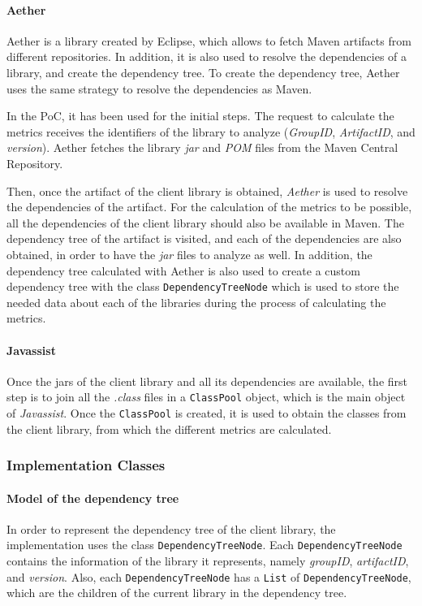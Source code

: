 \paragraph{Aether}
Aether is a library created by Eclipse, which allows to fetch Maven artifacts from different repositories. In addition, it is also used to resolve the dependencies of a library, and create the dependency tree. To create the dependency tree, Aether uses the same strategy to resolve the dependencies as Maven.

In the PoC, it has been used for the initial steps. The request to calculate the metrics receives the identifiers of the library to analyze (\textit{GroupID}, \textit{ArtifactID}, and \textit{version}). Aether fetches the library \textit{jar} and \textit{POM} files from the Maven Central Repository.

Then, once the artifact of the client library is obtained, \textit{Aether} is used to resolve the dependencies of the artifact. For the calculation of the metrics to be possible, all the dependencies of the client library should also be available in Maven. The dependency tree of the artifact is visited, and each of the dependencies are also obtained, in order to have the \textit{jar} files to analyze as well. In addition, the dependency tree calculated with Aether is also used to create a custom dependency tree with the class \texttt{DependencyTreeNode} which is used to store the needed data about each of the libraries during the process of calculating the metrics.

\paragraph{Javassist}
Once the jars of the client library and all its dependencies are available, the first step is to join all the \textit{.class} files in a \texttt{ClassPool} object, which is the main object of \textit{Javassist}. Once the \texttt{ClassPool} is created, it is used to obtain the classes from the client library, from which the different metrics are calculated.

\subsubsection{Implementation Classes}
\paragraph{Model of the dependency tree}
In order to represent the dependency tree of the client library, the implementation uses the class \texttt{DependencyTreeNode}. Each \texttt{DependencyTreeNode} contains the information of the library it represents, namely \textit{groupID}, \textit{artifactID}, and \textit{version}. Also, each \texttt{DependencyTreeNode} has a \texttt{List} of \texttt{DependencyTreeNode}, which are the children of the current library in the dependency tree.

